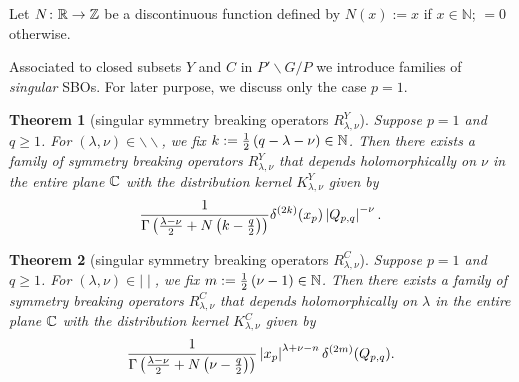 \documentclass[reqno,12pt]{pja00} %
\newtheorem{theorem}{Theorem}[section]
\theoremstyle{definition}
\theoremstyle{exampstyle} \newtheorem{examp}[theorem]{Theorem}
\renewcommand{\Q}{Q_{p,q}}
\begin{document}
Let $N\colon\mathbb{R}\to\mathbb{Z}$ be a discontinuous function defined
by $N(x):=x$ if $x \in \mathbb N$; $=0$ otherwise.

Associated to closed subsets $Y$ and $C$ in $P'\backslash G/P$ we introduce families of
\textit{singular} SBOs. For later purpose, we discuss only the case $p=1$.
\begin{theorem}[singular symmetry breaking operators $R_{\lambda,\nu}^Y$]\label{thm:singY}
	Suppose $p=1$ and $q\ge1$. For $(\lambda,\nu)\in\backslash\backslash$, we fix $k:=\frac{1}{2}\left( q-\lambda-\nu \right)\in\mathbb{N}$. Then there exists a family of symmetry breaking operators
	$R_{\lambda,\nu}^Y$ that depends holomorphically on $\nu$ in the entire plane $\mathbb{C}$ with the distribution kernel $K_{\lambda,\nu}^Y$ given by\begin{equation*}
		\frac{1}{\Gamma\left( \frac{\lambda-\nu}{2}+N\left( k-\frac{q}{2} \right) \right)}\delta^{(2k)}(x_p)\myabs{\Q}^{-\nu}.
	\end{equation*}
\end{theorem}
\begin{theorem}[singular symmetry breaking operators $R_{\lambda,\nu}^C$]\label{thm:singC}
	Suppose $p=1$ and $q\ge1$. For $(\lambda,\nu)\in\mid\mid$, we fix $m:=\frac{1}{2}\left(\nu-1 \right)\in\mathbb{N}$. Then there exists a family of symmetry breaking operators
	$R_{\lambda,\nu}^C$ that depends holomorphically on $\lambda$ in the entire plane $\mathbb{C}$ with the distribution kernel $K_{\lambda,\nu}^C$ given by
	\begin{equation*}
	\frac{1}{\Gamma\left( \frac{\lambda-\nu}{2}+N\left(\nu- \frac{q}{2} \right) \right)}\myabs{x_p}^{\lambda+\nu-n}\delta^{(2m)}(\Q).
	\end{equation*}
\end{theorem}
\end{document}
